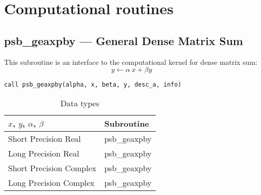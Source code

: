 \section{Computational routines}

%
%
\clearpage\subsection{psb\_geaxpby --- General Dense Matrix Sum}

This subroutine is an interface to the computational kernel for
dense matrix sum:
\[ y \leftarrow  \alpha\> x+ \beta y \] 

\begin{verbatim}
call psb_geaxpby(alpha, x, beta, y, desc_a, info)
\end{verbatim}

\begin{table}[h]
\begin{center}
\begin{tabular}{ll}
\hline
$x$, $y$, $\alpha$, $\beta$ & {\bf Subroutine}\\
\hline
Short Precision Real & psb\_geaxpby \\
Long Precision Real & psb\_geaxpby \\
Short Precision Complex & psb\_geaxpby \\
Long Precision Complex & psb\_geaxpby \\
\hline
\end{tabular}
\end{center}
\caption{Data types\label{tab:f90axpby}}
\end{table}

